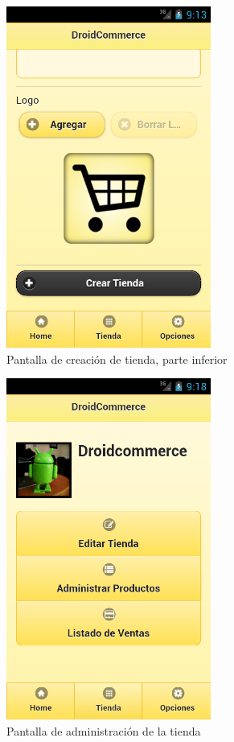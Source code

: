 \begin{figure}
  \centering
    \includegraphics[width=0.6\textwidth]{imagenes/capturas/crear-tienda2.png}
        \caption{Pantalla de creación de tienda, parte inferior}
    \label{fig:crear-tienda-2}
\end{figure}

\begin{figure}
  \centering
    \includegraphics[width=0.6\textwidth]{imagenes/capturas/administracion-tienda.png}
        \caption{Pantalla de administración de la tienda}
    \label{fig:admin-tienda}
\end{figure}


